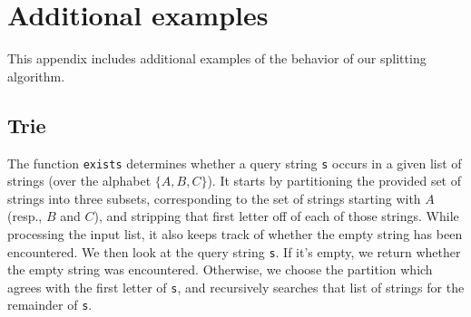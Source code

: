
\section{Additional examples}

This appendix includes additional examples of the behavior of our
splitting algorithm.



\subsection{Trie}

The function {\tt exists} determines whether a query string \texttt{s} occurs in
a given list of strings (over the alphabet $\{A,B,C\}$). It starts by
partitioning the provided set of strings into three subsets, corresponding to
the set of strings starting with $A$ (resp., $B$ and $C$), and stripping that
first letter off of each of those strings. While processing the input list, it
also keeps track of whether the empty string has been encountered.
%
We then look at the query string \texttt{s}. If it's empty, we return whether
the empty string was encountered. Otherwise, we choose the partition which
agrees with the first letter of \texttt{s}, and recursively searches that list
of strings for the remainder of \texttt{s}.

